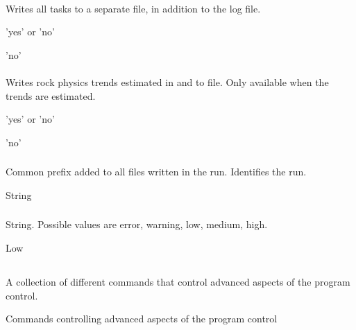 \paragraph{}
 \slist
   \item \Description Writes all tasks to a separate file, in
   addition to the log file.
   \item \Argument 'yes' or 'no'
   \item \Default 'no'
\elist

\paragraph{}
 \slist
   \item \Description Writes rock physics trends estimated in  and  to file. Only available when the trends are estimated.
   \item \Argument 'yes' or 'no'
   \item \Default 'no'
\elist

\subsubsection{}
 \slist
   \item \Description Common prefix added to all files written in the run. Identifies the run.
   \item \Argument String
   \item \Default
 \elist

\subsubsection{}
 \slist
   \item \Description
   \item \Argument String. Possible values are error, warning, low, medium, high.
   \item \Default Low
 \elist

\subsection{} 
 \slist
   \item \Description A collection of different commands that control advanced aspects of the program control.
   \item \Argument Commands controlling advanced aspects of the program control
   \item \Default
 \elist

